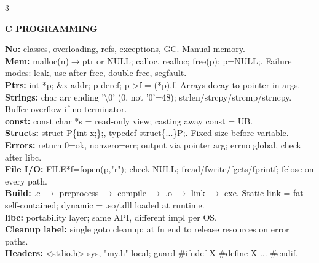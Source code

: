 \documentclass[10pt,letterpaper]{article}
\newenvironment{topic}[1]{%
  \par\addvspace{1.5pt}%
  \noindent\colorbox{hdrBG}{%
    \begin{minipage}{\dimexpr\linewidth-2\fboxsep\relax}%
      \centering\bfseries\sffamily\fontsize{6pt}{7pt}\selectfont\color{hdrFG}\MakeUppercase{#1}%
    \end{minipage}%
  }\par\nobreak\vskip0.5pt%
  \begingroup\setlength{\leftskip}{0pt}\setlength{\rightskip}{0pt}%
}{%
  \endgroup\par\addvspace{0.5pt}%
}
\newcommand{\hd}[1]{\textcolor{accent}{\textbf{#1}}}
\newcommand{\cn}[1]{{\ttfamily\small #1}}
\begin{document}
\begin{multicols*}{3}
\begin{topic}{C Programming}
\hd{No:} classes, overloading, refs, exceptions, GC. Manual memory.\\
\hd{Mem:} \cn{malloc(n)}$\to$ptr or NULL; \cn{calloc}, \cn{realloc}; \cn{free(p); p=NULL;}. Failure modes: leak, use-after-free, double-free, segfault.\\
\hd{Ptrs:} \cn{int *p}; \cn{\&x} addr; \cn{*p} deref; \cn{p->f} = \cn{(*p).f}. Arrays decay to pointer in args.\\
\hd{Strings:} char arr ending \cn{'\textbackslash 0'} (0, not \cn{'0'}=48); \cn{strlen/strcpy/strcmp/strncpy}. Buffer overflow if no terminator.\\
\hd{const:} \cn{const char *s} = read-only view; casting away const = UB.\\
\hd{Structs:} \cn{struct P\{int x;\};}, \cn{typedef struct\{...\}P;}. Fixed-size before variable.\\
\hd{Errors:} return 0=ok, nonzero=err; output via pointer arg; \cn{errno} global, check after libc.\\
\hd{File I/O:} \cn{FILE*f=fopen(p,"r");} check NULL; \cn{fread/fwrite/fgets/fprintf}; \cn{fclose} on every path.\\
\hd{Build:} \cn{.c} $\to$ preprocess $\to$ compile $\to$ \cn{.o} $\to$ link $\to$ exe. Static link = fat self-contained; dynamic = \cn{.so/.dll} loaded at runtime.\\
\hd{libc:} portability layer; same API, different impl per OS.\\
\hd{Cleanup label:} single \cn{goto cleanup;} at fn end to release resources on error paths.\\
\hd{Headers:} \cn{<stdio.h>} sys, \cn{"my.h"} local; guard \cn{\#ifndef X \#define X ... \#endif}.
\end{topic}


\end{multicols*}
\end{document}
